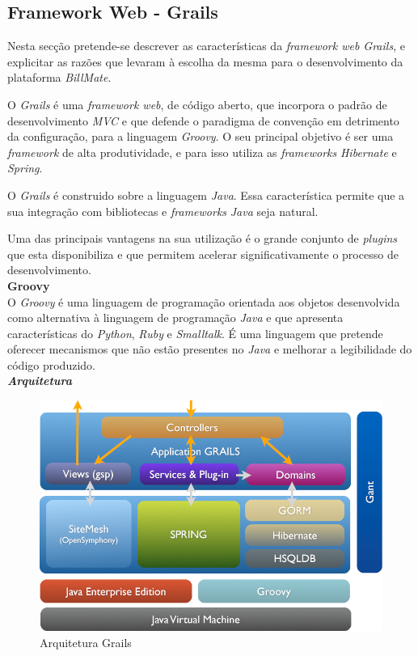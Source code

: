 \subsection{Framework Web - Grails}

Nesta secção pretende-se descrever as características da \textit{framework web Grails}, e explicitar as razões que levaram à escolha da mesma para o desenvolvimento da plataforma \textit{BillMate}.

O \textit{Grails} é uma \textit{framework web}, de código aberto, que incorpora o padrão de desenvolvimento \textit{MVC} e que defende o paradigma de convenção em detrimento da configuração, para a linguagem \textit{Groovy}. O seu principal objetivo é ser uma \textit{framework} de alta produtividade, e para isso utiliza as \textit{frameworks} \textit{Hibernate} e \textit{Spring}.

O \textit{Grails} é construido sobre a linguagem \textit{Java}. Essa característica permite que a sua integração com bibliotecas e \textit{frameworks} \textit{Java} seja natural.

Uma das principais vantagens na sua utilização é o grande conjunto de \textit{plugins} que esta disponibiliza e que permitem acelerar significativamente o processo de desenvolvimento.\\

\textbf{\large{Groovy}}\\

O \textit{Groovy} é uma linguagem de programação orientada aos objetos desenvolvida como alternativa à linguagem de programação \textit{Java} e que apresenta características do \textit{Python}, \textit{Ruby} e \textit{Smalltalk}. É uma linguagem que pretende oferecer mecanismos que não estão presentes no \textit{Java} e melhorar a legibilidade do código produzido.\\

\textbf{\textit{Arquitetura}}\\

\begin{figure}[H]
\centerline{\includegraphics[width=.5\textwidth]{images/implementation/architecture_grails}}
\caption{Arquitetura Grails}
\label{fig:arqgrails}
\end{figure}

